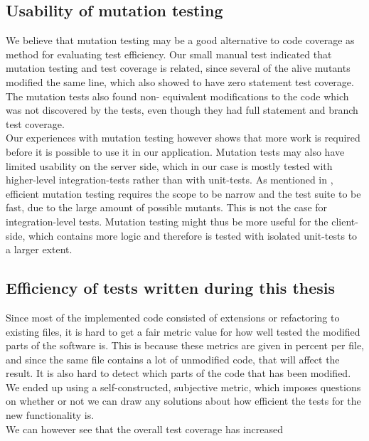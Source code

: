 \subsection{Usability of mutation testing}

We believe that mutation testing may be a good alternative to code
coverage as method for evaluating test efficiency. Our small manual test
indicated that mutation testing and test coverage is related, since
several of the alive mutants modified the same line, which also showed
to have zero statement test coverage. The mutation tests also found non-
equivalent modifications to the code which was not discovered by the
tests, even though they had full statement and branch test coverage.\\

Our experiences with mutation testing however shows that more work is
required before it is possible to use it in our application. Mutation
tests may also have limited usability on the server side, which in our
case is mostly tested with higher-level integration-tests rather than
with unit-tests. As mentioned in , efficient
mutation testing requires the scope to be narrow and the test suite to
be fast, due to the large amount of possible mutants. This is not the
case for integration-level tests. Mutation testing might thus be more
useful for the client-side, which contains more logic and therefore is
tested with isolated unit-tests to a larger extent.\\


\subsection{Efficiency of tests written during this thesis}

Since most of the implemented code consisted of extensions or
refactoring to existing files, it is hard to get a fair metric value for
how well tested the modified parts of the software is. This is because
these metrics are given in percent per file, and since the same file
contains a lot of unmodified code, that will affect the result. It is
also hard to detect which parts of the code that has been modified. We
ended up using a self-constructed, subjective metric, which imposes
questions on whether or not we can draw any solutions about how
efficient the tests for the new functionality is.\\

We can however see that the overall test coverage has increased

